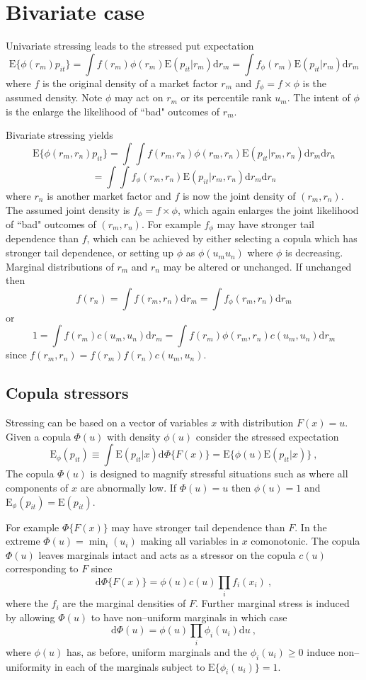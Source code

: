 \documentclass[authoryear]{elsarticle}
\newcommand{\E}{\mathrm{E}}
\newcommand{\de}{\mathrm{d}}
\newcommand{\be}[1]{\begin{equation}\label{#1}}
\newcommand{\ee}{\end{equation}}
\begin{document}
\section{Bivariate case}

Univariate stressing leads to the stressed put expectation
$$
\E\{\phi(r_m)p_{it}\} = \int  f(r_m)\phi(r_m)\E(p_{it}|r_m) \de r_m = \int f_\phi(r_m) \E(p_{it}|r_m) \de r_m
$$
where $f$ is the original density of a market factor $r_m$ and $f_\phi=f\times \phi$ is the assumed density. Note $\phi$ may act on $r_m$ or its percentile rank $u_m$. The intent of $\phi$ is the enlarge the likelihood of ``bad" outcomes of $r_m$.

Bivariate stressing yields
$$
\E\{\phi(r_m,r_n)p_{it}\} = \int \int f(r_m,r_n)\phi(r_m,r_n) \E(p_{it}|r_m, r_n) \de r_m \de r_n
$$
$$
= \int \int f_\phi(r_m,r_n) \E(p_{it}|r_m, r_n) \de r_m \de r_n
$$
where $r_n$ is another market factor and $f$ is now the joint density of $(r_m,r_n)$. The assumed joint density is $f_\phi=f\times \phi$, which again enlarges the joint likelihood of ``bad" outcomes of $(r_m,r_n)$. For example $f_\phi$ may have stronger tail dependence than $f$, which can be achieved by either selecting a copula which has stronger tail dependence, or setting up $\phi$ as $\phi(u_mu_n)$ where $\phi$ is decreasing. Marginal distributions of $r_m$ and $r_n$ may be altered or unchanged. If unchanged then
$$
f(r_n) = \int f(r_m,r_n) \de r_m = \int f_\phi(r_m,r_n) \de r_m
$$
or 
$$
1 = \int f(r_m)c(u_m,u_n) \de r_m = \int f(r_m)\phi(r_m,r_n) c(u_m,u_n) \de r_m
$$
since $f(r_m,r_n)=f(r_m)f(r_n)c(u_m,u_n)$.


\subsection{Copula stressors}

\newcommand{\Es}{\E_\phi}

Stressing can be based on a vector of variables $x$ with distribution $F(x)=u$.   Given a copula $\Phi(u)$ with density $\phi(u)$ consider
the stressed expectation 
\be{copula}
\Es(p_{it}) \equiv \int \E(p_{it}|x)  \de\Phi\{F(x)\}  =  \E\{\phi(u)\E(p_{it}|x)\}  \ ,
\ee
The  copula $\Phi(u)$ is designed to magnify  stressful situations such as  where all components of $x$ are abnormally low.
If $\Phi(u)=u$ then $\phi(u)=1$ and $\Es(p_{it})=\E(p_{it})$.  

For example $\Phi\{F(x)\}$ may have stronger tail dependence than $F$.   In the extreme  $\Phi(u)=\min_i(u_i)$ making all  variables in $x$  comonotonic.   The copula $\Phi(u)$  leaves marginals intact and acts as a stressor on the copula  $c(u)$  corresponding to $F$ since
$$
\de\Phi\{F(x)\} = \phi(u)c(u)\prod_if_i(x_i)\ ,
$$
where the $f_i$ are the  marginal densities of $F$.   Further marginal stress is induced by allowing $\Phi(u)$ to have non--uniform marginals in which case
$$
\de \Phi(u) = \phi(u)\prod_i\phi_i(u_i)\de u\ ,
$$
where $\phi(u)$ has, as before, uniform marginals and the $\phi_i(u_i)\ge 0$ induce non--uniformity in each of the marginals subject to $\E\{\phi_i(u_i)\} = 1$.  

   
\end{document}
